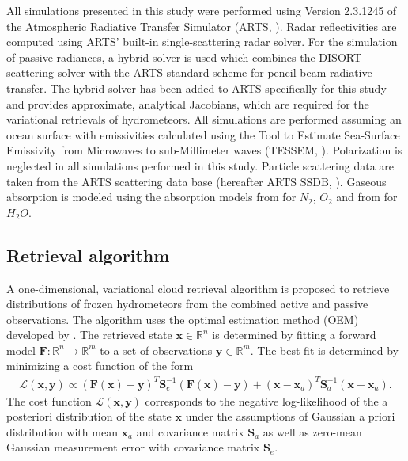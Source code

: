 \documentclass[journal abbreviation, manuscript]{copernicus}
\providecommand{\DIFadd}[1]{{\protect\color{blue}\uwave{#1}}} %
\providecommand{\DIFaddbegin}{} %
\providecommand{\DIFaddend}{} %
\begin{document}
All simulations presented in this study were performed using Version 2.3.1245 of
the Atmospheric Radiative Transfer Simulator (ARTS, \cite{arts18}). Radar
reflectivities are computed using ARTS' built-in single-scattering radar solver\DIFaddbegin \DIFadd{,
which provides analytic Jacobians}\DIFaddend . For the simulation of passive radiances, a
hybrid solver is used which combines the DISORT \citep{disort00} scattering
solver with the ARTS standard scheme for pencil beam radiative transfer. The
hybrid solver has been added to ARTS specifically for this study and provides
approximate, analytical Jacobians, which are required for the variational
retrievals of hydrometeors. All simulations are performed assuming an ocean
surface with emissivities calculated using the Tool to Estimate Sea‐Surface
Emissivity from Microwaves to sub‐Millimeter waves (TESSEM, \cite{prigent16}).
Polarization is neglected in all simulations performed in this study. Particle
scattering data are taken from the ARTS scattering data base (hereafter ARTS
SSDB, \citet{eriksson18}). Gaseous absorption is modeled using the absorption
models from \cite{rosenkranz93} for $N_2$, $O_2$ and from \cite{rosenkranz98}
for $H_2O$.


\subsection{Retrieval algorithm}
\label{sec:orgb528563}

A one-dimensional, variational cloud retrieval algorithm is proposed to
retrieve distributions of frozen hydrometeors from the combined active and
passive observations. The algorithm uses the optimal estimation method (OEM)
developed by \cite{rodgers00}. The retrieved state $\mathbf{x} \in
   \mathbb{R}^n$ is determined by fitting a forward model $\mathbf{F} : \mathbb{R}^n
   \rightarrow \mathbb{R}^m$ to a set of observations $\mathbf{y} \in
   \mathbb{R}^m$. The best fit is determined by minimizing a cost function of
the form
\begin{align}
\mathcal{L}(\mathbf{x}, \mathbf{y}) \propto
 \left(\mathbf{F}(\mathbf{x}) - \mathbf{y} \right )^T
  \mathbf{S}_e^{-1} 
  \left ( \mathbf{F}(\mathbf{x}) - \mathbf{y} \right)
+ \left ( \mathbf{x} - \mathbf{x}_a \right )^T
 \mathbf{S}^{-1}_a 
 \left ( \mathbf{x} - \mathbf{x}_a \right ).
\end{align}
%
The cost function $\mathcal{L}(\mathbf{x}, \mathbf{y})$ corresponds to the negative
log-likelihood of the a posteriori distribution of the state $\mathbf{x}$ under
the assumptions of Gaussian a priori distribution with mean $\mathbf{x}_a$ and
covariance matrix $\mathbf{S}_a$ as well as zero-mean Gaussian measurement error
with covariance matrix $\mathbf{S}_e$.
\end{document}
